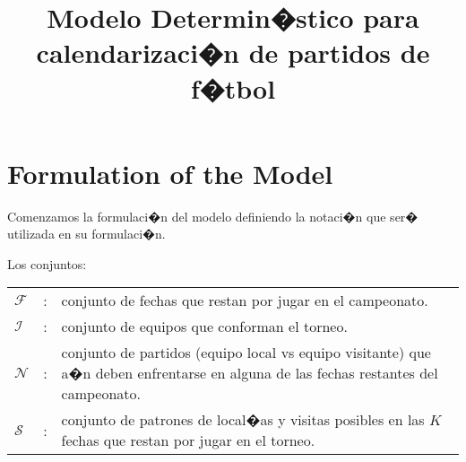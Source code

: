 \documentclass[authoryear,preprint,review,12pt]{elsarticle}
\begin{document}
\begin{frontmatter}

\newtheorem{lem}{Lema}
\newtheorem{defi}{Definition}
\newtheorem{pro}{Proposition}
\newtheorem{cor}{Corollary}


\title{Modelo Determin�stico para calendarizaci�n de partidos de f�tbol}


\end{frontmatter}


\section{Formulation of the Model}\label{FM}
Comenzamos la formulaci�n del modelo definiendo la notaci�n que ser� utilizada en su formulaci�n.

\vspace{0.05in} Los conjuntos:

\begin{tabular}{p{1.6cm}cp{12.69cm}}
$\mathcal{F}$   & : & conjunto de fechas que restan por jugar en el campeonato.\\
$\mathcal{I}$   & : & conjunto de equipos que conforman el torneo.\\
$\mathcal{N}$   & : & conjunto de partidos (equipo local vs equipo visitante) que a�n deben enfrentarse en alguna de las fechas restantes del campeonato.\\
$\mathcal{S}$   & : & conjunto de patrones de local�as y visitas posibles en las $K$ fechas que restan por jugar en el torneo.
\end{tabular}
\end{document}

